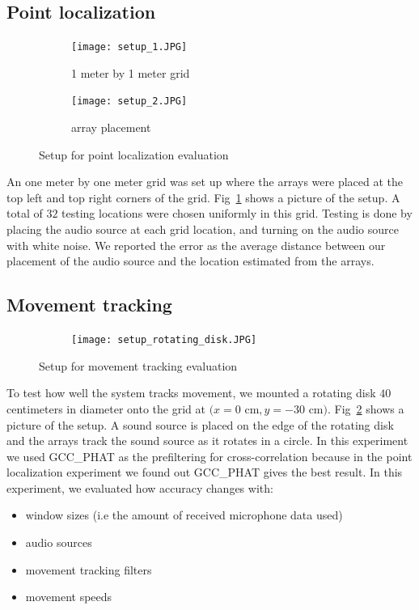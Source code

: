 \subsection{Point localization}

\begin{figure}[h!]
  \centering
  \begin{subfigure}[]{.48\textwidth}
    \texttt{[image: setup\_1.JPG]}
    \caption{1 meter by 1 meter grid}
  \end{subfigure}
  \begin{subfigure}[]{.48\textwidth}
    \texttt{[image: setup\_2.JPG]}
    \caption{array placement}
  \end{subfigure}
  \caption{Setup for point localization evaluation}
  \label{fig:setup_point}
\end{figure}

An one meter by one meter grid was set up where the arrays were placed at the top left and top right corners of the grid. Fig~\ref{fig:setup_point} shows a picture of the setup. A total of $32$ testing locations were chosen uniformly in this grid. Testing is done by placing the audio source at each grid location, and turning on the audio source with white noise. We reported the error as the average distance between our placement of the audio source and the location estimated from the arrays.

\subsection{Movement tracking}

\begin{figure}[h!]
  \centering
  \begin{subfigure}[]{1.0\textwidth}
    \texttt{[image: setup\_rotating\_disk.JPG]}
  \end{subfigure}
  \caption{Setup for movement tracking evaluation}
  \label{fig:setup_circle}
\end{figure}


To test how well the system tracks movement, we mounted a rotating disk $40$ centimeters in diameter onto the grid at $(x=0$ cm$, y=-30$ cm$)$. Fig~\ref{fig:setup_circle} shows a picture of the setup. A sound source is placed on the edge of the rotating disk and the arrays track the sound source as it rotates in a circle. In this experiment we used GCC\_PHAT as the prefiltering for cross-correlation because in the point localization experiment we found out GCC\_PHAT gives the best result. In this experiment, we evaluated how accuracy changes with:
\begin{itemize}
\item window sizes (i.e the amount of received microphone data used)
\item audio sources
\item movement tracking filters
\item movement speeds
\end{itemize}

